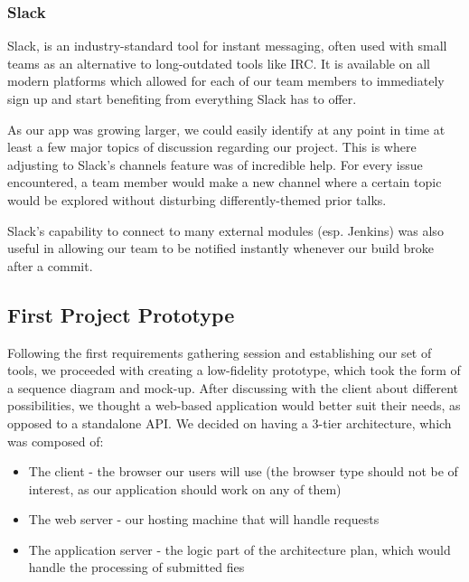 \documentclass{l3proj}
\begin{document}
\subsubsection{Slack}
\label{sec:slack}

Slack, is an industry-standard tool for instant messaging, often used with small teams as an alternative to long-outdated tools like IRC. It is available on all modern platforms which allowed for each of our team members to immediately sign up and start benefiting from everything Slack has to offer.

As our app was growing larger, we could easily identify at any point in time at least a few major topics of discussion regarding our project. This is where adjusting to Slack's channels feature was of incredible help. For every issue encountered, a team member would make a new channel where a certain topic would be explored without disturbing differently-themed prior talks.

Slack's capability to connect to many external modules (esp. Jenkins) was also useful in allowing our team to be notified instantly whenever our build broke after a commit.

\subsection{First Project Prototype}
\label{sec:first_proto}

Following the first requirements gathering session and establishing our set of tools, we proceeded with creating a low-fidelity prototype, which took the form of a sequence diagram and mock-up. After discussing with the client about different possibilities, we thought a web-based application would better suit their needs, as opposed to a standalone API. We decided on having a 3-tier architecture, which was composed of:
 
\begin{itemize}
    \item The client - the browser our users will use (the browser type should not be of interest, as our application should work on any of them)
    \item The web server - our hosting machine that will handle requests
    \item The application server  - the logic part of the architecture plan, which would handle the processing of submitted fies
\end{itemize}
\end{document}
